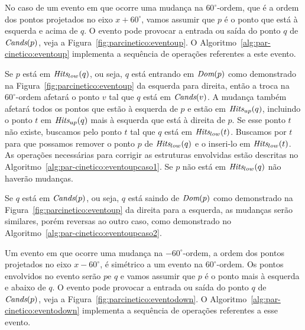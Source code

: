 

No caso de um evento em que ocorre uma mudança na $60^\circ$-ordem, que é a ordem dos pontos
projetados no eixo $x + 60^\circ$, vamos assumir que $p$ é o ponto que está à esquerda e acima de $q$.
O evento pode provocar a entrada ou saída do ponto $q$ de $\textit{Cands}(p)$, veja a
Figura~\ref{fig:parcinetico:eventoup}.
O Algoritmo~\ref{alg:par-cinetico:eventoup} implementa a sequência de operações referentes a este
evento.

Se $p$ está em $\textit{Hits}_{low}(q)$, ou seja, $q$ está entrando em $\textit{Dom}(p)$ como demonstrado na
Figura~\ref{fig:parcinetico:eventoup} da esquerda para direita, então a troca na $60^\circ$-ordem
afetará o ponto $v$ tal que $q$ está em $\textit{Cands}(v)$.
A mudança também afetará todos os pontos que estão à esquerda de $p$ e estão em $\textit{Hits}_{up}(q)$,
incluindo o ponto $t$ em $\textit{Hits}_{up}(q)$ mais à esquerda que está à direita de $p$.
Se esse ponto $t$ não existe, buscamos pelo ponto $t$ tal que $q$ está em $\textit{Hits}_{low}(t)$.
Buscamos por $t$ para que possamos remover o ponto $p$ de $\textit{Hits}_{low}(q)$ e o inseri-lo em
$\textit{Hits}_{low}(t)$.
As operações necessárias para corrigir as estruturas envolvidas estão descritas no
Algoritmo~\ref{alg:par-cinetico:eventoupcaso1}.
Se $p$ não está em $\textit{Hits}_{low}(q)$ não haverão mudanças.





Se $q$ está em $\textit{Cands}(p)$, ou seja, $q$ está saindo de $\textit{Dom}(p)$ como demonstrado na
Figura~\ref{fig:parcinetico:eventoup} da direita para a esquerda, as mudanças serão similares,
porém reversas ao outro caso, como demonstrado no Algoritmo~\ref{alg:par-cinetico:eventoupcaso2}.



Um evento em que ocorre uma mudança na $-60^\circ$-ordem, a ordem dos pontos projetados no eixo $x
- 60^\circ$, é simétrico a um evento na $60^\circ$-ordem.
Os pontos envolvidos no evento serão $p$e $q$ e vamos assumir que $p$ é o ponto mais à esquerda e
abaixo de $q$.
O evento pode provocar a entrada ou saída do ponto $q$ de $\textit{Cands}(p)$, veja a
Figura~\ref{fig:parcinetico:eventodown}.
O Algoritmo~\ref{alg:par-cinetico:eventodown} implementa a sequência de operações referentes a esse
evento.



